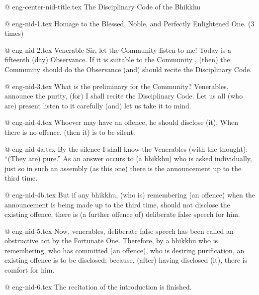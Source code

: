 @ eng-center-nid-title.tex
The Disciplinary Code of the Bhikkhu

@ eng-nid-1.tex
Homage to the Blessed, Noble, and Perfectly Enlightened One.
(3 times)

@ eng-nid-2.tex
Venerable Sir, let the Community listen to me! Today is a fifteenth (day) Observance. If it is suitable to the Community , (then) the Community should do the Observance (and) should recite the Disciplinary Code.

@ eng-nid-3.tex
What is the preliminary for the Community? Venerables, announce the purity, (for) I shall recite the Disciplinary Code. Let us all (who are) present listen to it carefully (and) let us take it to mind.

@ eng-nid-4.tex
Whoever may have an offence, he should disclose (it). When there is no offence, (then it) is to be silent.

@ eng-nid-4a.tex
By the silence I shall know the Venerables (with the thought): “(They are) pure.” As an answer occurs to (a bhikkhu) who is asked individually, just so in such an assembly (as this one) there is the announcement up to the third time. 

@ eng-nid-4b.tex
But if any bhikkhu, (who is) remembering (an offence) when the announcement is being made up to the third time, should not disclose the existing offence, there is (a further offence of) deliberate false speech for him.

@ eng-nid-5.tex
Now, venerables, deliberate false speech has been called an obstructive act by the Fortunate One. Therefore, by a bhikkhu who is remembering, who has committed (an offence), who is desiring purification, an existing offence is to be disclosed; because, (after) having disclosed (it), there is comfort for him.

@ eng-nid-6.tex
The recitation of the introduction is finished.
